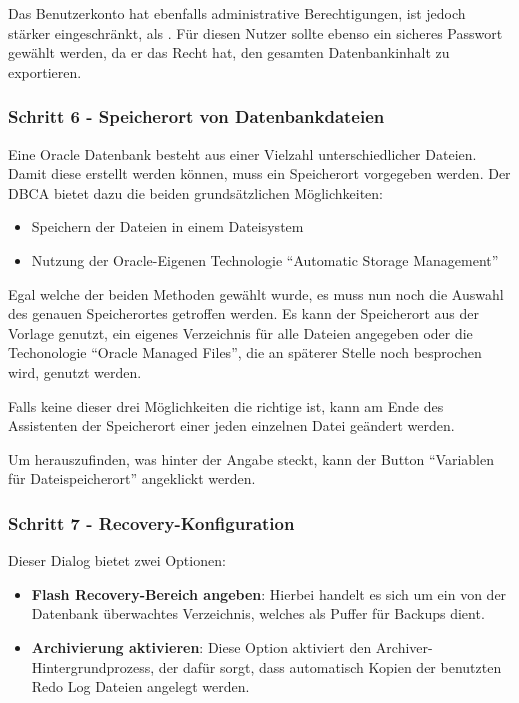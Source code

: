           Das Benutzerkonto  hat ebenfalls administrative Berechtigungen, ist jedoch st\"arker eingeschr\"ankt, als . F\"ur diesen Nutzer sollte ebenso ein sicheres Passwort gew\"ahlt werden, da er das Recht hat, den gesamten Datenbankinhalt zu exportieren.

        \subsubsection{Schritt 6 - Speicherort von Datenbankdateien}
          Eine Oracle Datenbank besteht aus einer Vielzahl unterschiedlicher Dateien. Damit diese erstellt werden k\"onnen, muss ein Speicherort vorgegeben werden. Der DBCA bietet dazu die beiden grunds\"atzlichen M\"oglichkeiten:
          \begin{itemize}
            \item Speichern der Dateien in einem Dateisystem
            \item Nutzung der Oracle-Eigenen Technologie \enquote{Automatic Storage Management}
          \end{itemize}
          Egal welche der beiden Methoden gew\"ahlt wurde, es muss nun noch die Auswahl des genauen Speicherortes getroffen werden. Es kann der Speicherort aus der Vorlage genutzt, ein eigenes Verzeichnis f\"ur alle Dateien angegeben oder die Techonologie \enquote{Oracle Managed Files}, die an sp\"aterer Stelle noch besprochen wird, genutzt werden.

          Falls keine dieser drei M\"oglichkeiten die richtige ist, kann am Ende des Assistenten der Speicherort einer jeden einzelnen Datei ge\"andert werden.

          Um herauszufinden, was hinter der Angabe  steckt, kann der Button \enquote{Variablen f\"ur Dateispeicherort} angeklickt werden.
        \subsubsection{Schritt 7 - Recovery-Konfiguration}
          Dieser Dialog bietet zwei Optionen:
          \begin{itemize}
            \item \textbf{Flash Recovery-Bereich angeben}: Hierbei handelt es sich um ein von der Datenbank \"uberwachtes Verzeichnis, welches als Puffer f\"ur Backups dient.
            \item \textbf{Archivierung aktivieren}: Diese Option aktiviert den Archiver-Hintergrundprozess, der daf\"ur sorgt, dass automatisch Kopien der benutzten Redo Log Dateien angelegt werden.
          \end{itemize}
